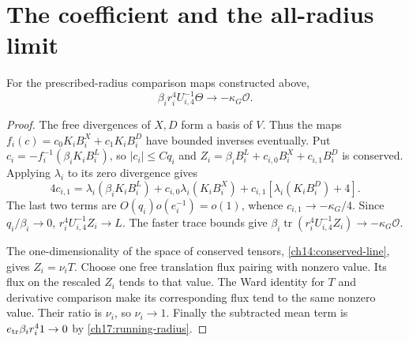 

\section{The coefficient and the all-radius limit}
\label{ch17:limit}

\begin{proposition}
\label{ch17:coefficient}
For the prescribed-radius comparison maps constructed above,
\[
          \beta_i r_i^4 U_{i,4}^{-1}\Theta
                       \longrightarrow-\kappa_G\mathcal O.
\]
\end{proposition}
\begin{proof}
The free divergences of $X,D$ form a basis of $V$. Thus the maps
$f_i(c)=c_0K_iB_i^X+c_1K_iB_i^D$ have bounded inverses eventually.
Put $c_i=-f_i^{-1}(\beta_iK_iB_i^L)$, so $|c_i|\le Cq_i$ and
$Z_i=\beta_iB_i^L+c_{i,0}B_i^X+c_{i,1}B_i^D$ is conserved.
Applying $\lambda_i$ to its zero divergence gives
\[
 4c_{i,1}=\lambda_i(\beta_iK_iB_i^L)
 +c_{i,0}\lambda_i(K_iB_i^X)
 +c_{i,1}[\lambda_i(K_iB_i^D)+4].
\]
The last two terms are $O(q_i)o(e_i^{-1})=o(1)$, whence
$c_{i,1}\to-\kappa_G/4$. Since $q_i/\beta_i\to0$,
$r_i^4U_{i,4}^{-1}Z_i\to L$. The faster trace bounds give
$\beta_i\operatorname{tr}(r_i^4U_{i,4}^{-1}Z_i)
\to-\kappa_G\mathcal O$.

The one-dimensionality of the space of conserved tensors, \eqref{ch14:conserved-line}, gives $Z_i=\nu_iT$. Choose one free translation
flux pairing with nonzero value. Its flux on the rescaled $Z_i$ tends
to that value. The Ward identity for $T$ and derivative comparison
make its corresponding flux tend to the same nonzero value.
Their ratio is $\nu_i$, so $\nu_i\to1$. Finally the subtracted mean term is
$e_{\rm tr}\beta_i r_i^4 1\to0$ by \eqref{ch17:running-radius}.
\end{proof}


